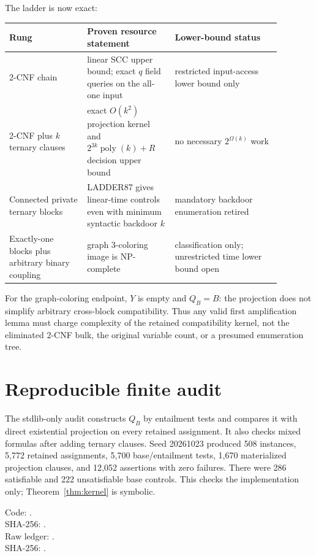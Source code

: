 \documentclass[11pt]{article}
\begin{document}
The ladder is now exact:
\begin{center}\small
\begin{tabular}{p{0.25\linewidth}p{0.29\linewidth}p{0.34\linewidth}}
\toprule
Rung & Proven resource statement & Lower-bound status\\\midrule
2-CNF chain & linear SCC upper bound; exact $q$ field queries on the all-one
input & restricted input-access lower bound only\\
2-CNF plus $k$ ternary clauses & exact $O(k^2)$ projection kernel and
$2^{3k}\operatorname{poly}(k)+R$ decision upper bound & no necessary
$2^{\Omega(k)}$ work\\
Connected private ternary blocks & LADDER87 gives linear-time controls even
with minimum syntactic backdoor $k$ & mandatory backdoor enumeration retired\\
Exactly-one blocks plus arbitrary binary coupling & graph 3-coloring image is
NP-complete & classification only; unrestricted time lower bound open\\
\bottomrule
\end{tabular}
\end{center}

For the graph-coloring endpoint, $Y$ is empty and $Q_B=B$: the projection
does not simplify arbitrary cross-block compatibility.  Thus any valid first
amplification lemma must charge complexity of the retained compatibility
kernel, not the eliminated 2-CNF bulk, the original variable count, or a
presumed enumeration tree.

\section{Reproducible finite audit}
The stdlib-only audit constructs $Q_B$ by entailment tests and compares it
with direct existential projection on every retained assignment.  It also
checks mixed formulas after adding ternary clauses.  Seed 20261023 produced
508 instances, 5,772 retained assignments, 5,700 base/entailment tests,
1,670 materialized projection clauses, and 12,052 assertions with zero
failures.  There were 286 satisfiable and 222 unsatisfiable base controls.
This checks the implementation only; Theorem~\ref{thm:kernel} is symbolic.

Code: .\\
SHA-256: .\\
Raw ledger: .\\
SHA-256: .
\end{document}
